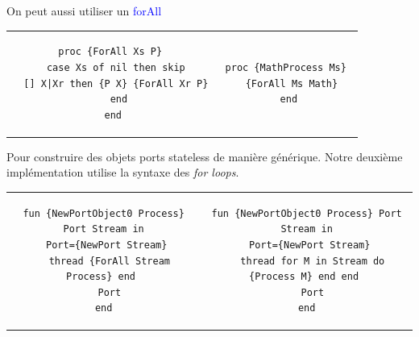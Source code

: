 \documentclass{report}
\begin{document}
On peut aussi utiliser un \textcolor{blue}{forAll}
\begin{center}
\begin{tabular}{c|c}
\begin{lstlisting}[escapechar=\%]
proc {ForAll Xs P} 
  case Xs of nil then skip 
  [] X|Xr then {P X} {ForAll Xr P} 
  end
end
\end{lstlisting} & \begin{lstlisting}[escapechar=\%]
proc {MathProcess Ms} 
  {ForAll Ms Math} 
end
\end{lstlisting}
\end{tabular}
\end{center}

Pour construire des objets ports stateless de manière générique. Notre deuxième implémentation utilise la syntaxe des \textit{for loops}. 
\begin{center}
\begin{tabular}{c|c}
\begin{lstlisting}[escapechar=\%]
fun {NewPortObject0 Process} Port Stream in
  Port={NewPort Stream} 
  thread {ForAll Stream Process} end 
  Port
end
\end{lstlisting} & \begin{lstlisting}[escapechar=\%]
fun {NewPortObject0 Process} Port Stream in
  Port={NewPort Stream} 
  thread for M in Stream do {Process M} end end 
  Port
end
\end{lstlisting}
\end{tabular}
\end{center}
\end{document}
